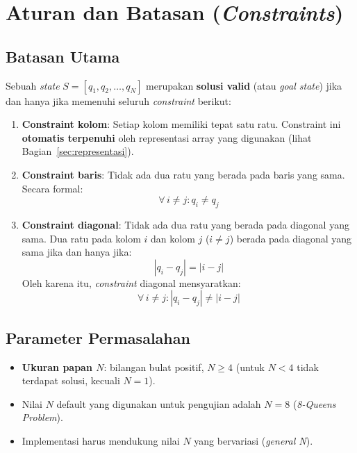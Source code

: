 \documentclass[12pt,a4paper]{article}
\begin{document}
\section{Aturan dan Batasan (\textit{Constraints})}
\label{sec:constraints}

\subsection{Batasan Utama}
\label{subsec:batasan-utama}

Sebuah \textit{state} $S = [q_1, q_2, \ldots, q_N]$ merupakan \textbf{solusi valid} (atau \textit{goal state}) jika dan hanya jika memenuhi seluruh \textit{constraint} berikut:

\begin{enumerate}[label=\textbf{C\arabic*.}]
    \item \textbf{Constraint kolom}: Setiap kolom memiliki tepat satu ratu. Constraint ini \textbf{otomatis terpenuhi} oleh representasi array yang digunakan (lihat Bagian~\ref{sec:representasi}).

    \item \textbf{Constraint baris}: Tidak ada dua ratu yang berada pada baris yang sama. Secara formal:
    \[
        \forall\, i \neq j : q_i \neq q_j
    \]

    \item \textbf{Constraint diagonal}: Tidak ada dua ratu yang berada pada diagonal yang sama. Dua ratu pada kolom $i$ dan kolom $j$ ($i \neq j$) berada pada diagonal yang sama jika dan hanya jika:
    \[
        |q_i - q_j| = |i - j|
    \]
    Oleh karena itu, \textit{constraint} diagonal mensyaratkan:
    \[
        \forall\, i \neq j : |q_i - q_j| \neq |i - j|
    \]
\end{enumerate}

\subsection{Parameter Permasalahan}
\label{subsec:parameter}

\begin{itemize}
    \item \textbf{Ukuran papan $N$}: bilangan bulat positif, $N \geq 4$ (untuk $N < 4$ tidak terdapat solusi, kecuali $N = 1$).
    \item Nilai $N$ default yang digunakan untuk pengujian adalah $N = 8$ (\textit{8-Queens Problem}).
    \item Implementasi harus mendukung nilai $N$ yang bervariasi (\textit{general N}).
\end{itemize}
\end{document}
